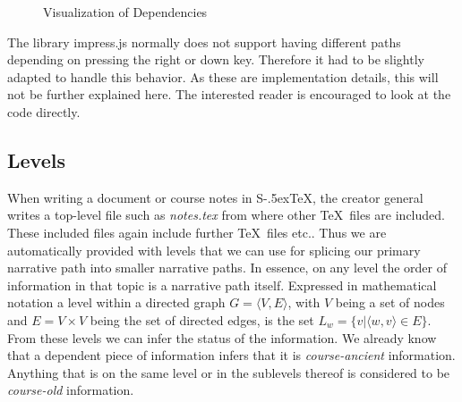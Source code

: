 \documentclass[twoside, 12pt]{article}
\def\stex{\texorpdfstring{\raisebox{-.5ex}S\kern-.5ex\TeX}{sTeX}\xspace}
\begin{document}
\begin{figure}
\vspace{-16pt}
  \begin{center}
\vspace{-20pt}
  \caption{Visualization of Dependencies}
  \label{fig:visualDependency}
\vspace{12pt}
  \end{center}
\end{figure}

\begin{figure}
\vspace{-50pt}
\end{figure}

The library impress.js normally does not support having different paths depending on pressing the right or down key. Therefore it had to be slightly adapted to handle this behavior. As these are implementation details, this will not be further explained here. The interested reader is encouraged to look at the code \cite{npentrel:npentrel15} directly.

\subsection{Levels}
\label{sec:levels}

When writing a document or course notes in \stex, the creator general writes a top-level file such as \textit{notes.tex} from where other \TeX\ files are included. These included files again include further \TeX\ files etc.. Thus we are automatically provided with levels that we can use for splicing our primary narrative path into smaller narrative paths. In essence, on any level the order of information in that topic is a narrative path itself. Expressed in mathematical notation a level within a directed graph $G = \langle V, E \rangle $, with $V$ being a set of nodes and $E = V \times V$ being the set of directed edges, is the set $L_w = \lbrace v \vert \langle w, v \rangle \in E \rbrace$. From these levels we can infer the status of the information. We already know that a dependent piece of information infers that it is \textit{course-ancient} information. Anything that is on the same level or in the sublevels thereof is considered to be \textit{course-old} information.
\end{document}
